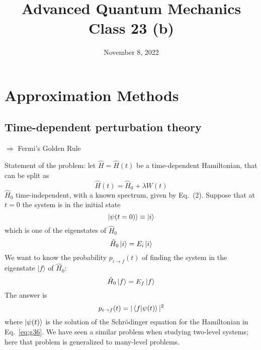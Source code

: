 \documentclass[12pt]{article}
\title{Advanced Quantum Mechanics\\Class 23 (b)}
\date{November 8, 2022}                                           %
\newcommand{\be}{\begin{equation}}
\newcommand{\ee}{\end{equation}}
\begin{document}
\maketitle

\setcounter{section}{6}
\setcounter{equation}{35}

\section{Approximation Methods}

\setcounter{subsection}{1}
\subsection{Time-dependent perturbation theory}

$\Rightarrow$ Fermi's Golden Rule

Statement of the problem: let $\hat{H} = \hat{H}(t)$ be a time-dependent Hamiltonian,
that can be split as
\be
\hat{H}(t) = \hat{H}_0 + \lambda W(t)
\label{eq:g36}
\ee
$\hat{H}_0$ time-independent, with a known spectrum, given
by Eq.~(2). Suppose that at $t=0$ the system is
in the initial state
\be
\ket{\psi(t=0)} \equiv \ket{i}
\ee
which is one of the eigenstates of $\hat{H}_0$
\be
\hat{H}_0 \ket{i} = E_i \ket{i}
\ee
We want to know the probability $p_{i \rightarrow f}(t)$ of finding
the system in the eigenstate $|f\rangle$ of $\hat{H}_{0}$:
\be
\hat{H}_0 \ket{f} = E_f \ket{f}
\ee
The answer is
\be
p_{i \rightarrow f}(t) = |\bra{f}\ket{\psi(t)}|^2
\label{eq:g40}
\ee
where $\ket{\psi(t)}$ is the solution of the Schrödinger equation
for the Hamiltonian in Eq.~\eqref{eq:g36}.
We have seen a similar problem when
studying two-level systems; here that
problem is generalized to many-level problems.
\end{document}

